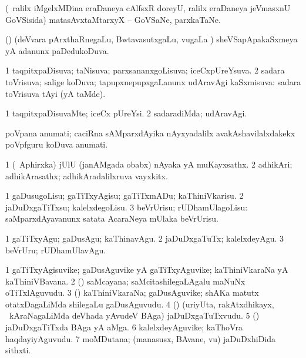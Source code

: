 \noindent
\gl{\pagu}
\bmng
{} (\kanmu\ ralilx iMgelxMDina eraDaneya cAlfsxR doreyU, ralilx eraDaneya jeVmasxnU GoVSisida) matasAvxtaMtarxyX -- GoVSaNe, parxkaTaNe. 
\emng
\eentry

\bentry
{}
\gl{\gu}
\bmng
(\roVkAyx \ca) (deVvara pArxthaRnegaLu, BwtavasutxgaLu, \mo vugaLa \vi) sheVSapApakaSxmeya yA adanunx paDedukoDuva. 
\emng
\eentry

\bentry
{}
\gl{\gu}
\bmng
\bnum
\num{1} taqpitxpaDisuva; taNisuva; parxsananxgoLisuva; iceCxpUreYsuva. 
\num{2} sadara toVrisuva; salige koDuva; tapupxnepupxgaLanunx udAravAgi kaSxmisuva:  sadara toVrisuva tAyi (yA taMde). 
\enum
\emng
\eentry

\bentry
{}
\gl{\kirxvi}
\bmng
\bnum
\num{1} taqpitxpaDisuvaMte; iceCx pUreYsi. 
\num{2} sadaradiMda; udAravAgi. 
\enum
\emng
\eentry

\bentry
{}
\gl{\nA}
\bmng
poVpana anumati; caciRna sAMparxdAyika nAyxyadalilx avakAshavilalxdakekx poVpfguru koDuva anumati. 
\emng
\eentry

\bentry
{}
\gl{\nA}
\bmng
\bnum
\num{1} (\da\ Aphirxka) jUlU (janAMgada obabx) nAyaka yA muKayxsathx. 
\num{2} adhikAri; adhikArasathx; adhikAradalilxruva vayxkitx. 
\enum
\emng
\eentry

\bentry
{}
\gl{\sakirx}
\bmng
\bnum
\num{1} gaDusugoLisu; gaTiTxyAgisu; gaTiTxmADu; kaThiniVkarisu. 
\num{2} jaDuDxgaTiTxsu; kalelxdegoLisu. 
\num{3} beVrUrisu; rUDhamUlagoLisu:  saMparxdAyavanunx satata AcaraNeya mUlaka beVrUrisu. 
\enum
\emng

\noindent
\gl{\akirx}
\bmng
\bnum
\num{1} gaTiTxyAgu; gaDusAgu; kaThinavAgu. 
\num{2} jaDuDxgaTuTx; kalelxdeyAgu. 
\num{3} beVrUru; rUDhamUlavAgu. 
\enum
\emng
\eentry

\bentry
{}
\gl{\nA}
\bmng
\bnum
\num{1} gaTiTxyAgisuvike; gaDusAguvike yA gaTiTxyAguvike; kaThiniVkaraNa yA kaThiniVBavana. 
\num{2} (\BUvi) saMcayana; saMcitashilegaLAgalu maNuNx oTiTxlAguvudu. 
\num{3} (\BUvi) kaThiniVkaraNa; gaDusAguvike; shAKa matutx otatxDagaLiMda shilegaLu gaDusAguvudu. 
\num{4} (\veYshA) (uriyUta, rakAtxdhikayx, \mo\ kAraNagaLiMda deVhada yAvudeV BAga) jaDuDxgaTuTxvudu. 
\num{5} (\veYshA) jaDuDxgaTiTxda BAga yA aMga. 
\num{6} kalelxdeyAguvike; kaThoVra haqdayiyAguvudu. 
\num{7} moMDutana; (manasusx, BAvane, \mo vu) jaDuDxhiDida sithxti. 
\enum
\emng
\eentry

